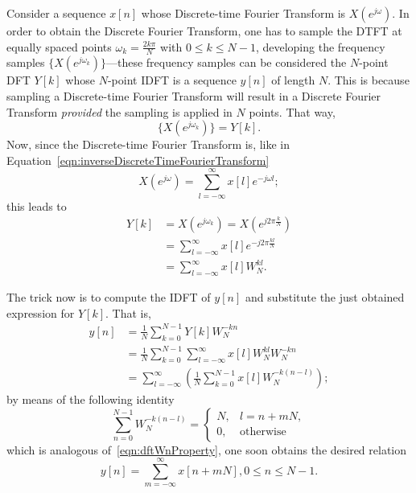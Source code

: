 \documentclass[\documentfontsize, twocolumn]{\classname}
\begin{document}
Consider a sequence $x[n]$ whose Discrete-time Fourier Transform is $X(e^{j\omega})$. In order to obtain the Discrete Fourier Transform, one has to sample the DTFT at equally spaced points $\omega_k = \frac{2k\pi}{N}$ with $0 \leq k \leq N-1$, developing the frequency samples $\{X(e^{j\omega_k})\}$---these frequency samples can be considered the $N$-point DFT $Y[k]$ whose $N$-point IDFT is a sequence $y[n]$ of length $N$. This is because sampling a Discrete-time Fourier Transform will result in a Discrete Fourier Transform \emph{provided} the sampling is applied in $N$ points. That way, \[\{X(e^{j\omega_k})\} = Y[k].\]
Now, since the Discrete-time Fourier Transform is, like in Equation~\ref{eqn:inverseDiscreteTimeFourierTransform}
\[
    X(e^{j\omega}) = \sum_{l=-\infty}^\infty x[l] e^{-j\omega l};
\]
this leads to
\begin{align*}
    Y[k]
    &=  X(e^{j\omega_k}) = X\left(e^{j2\pi \frac k N}\right)\\
    &= \sum_{l=-\infty}^\infty x[l] e^{-j2\pi \frac{kl}{N}}\\
    &= \sum_{l=-\infty}^\infty x[l]W_N^{kl}.
\end{align*}

The trick now is to compute the IDFT of $y[n]$ and substitute the just obtained expression for $Y[k]$. That is,
\begin{align*}
    y[n]
    &= \frac 1 N \sum_{k=0}^{N-1} Y[k] W_N^{-kn}\\
    &= \frac 1 N \sum_{k=0}^{N-1}\sum_{l=-\infty}^\infty x[l]W_N^{kl} W_N^{-kn}\\
    &= \sum_{l=-\infty}^\infty\left(\frac 1 N \sum_{k=0}^{N-1} x[l]W_N^{-k(n-l)}\right);
\end{align*}
by means of the following identity
\begin{equation}\label{eqn:dftWnPropertyTwo}
    \sum_{n=0}^{N-1}W_N^{-k(n-l)} = \left\{\begin{array}{ll} N, & l = n + mN, \\ 0, & \mbox{otherwise}\end{array}\right.
\end{equation}
which is analogous of~\ref{eqn:dftWnProperty}, one soon obtains the desired relation
\begin{equation}\label{eqn:dftInfiniteReplicas}
    y[n] = \sum_{m=-\infty}^{\infty} x[n + mN], 0 \leq n \leq N-1.
\end{equation}
\end{document}
